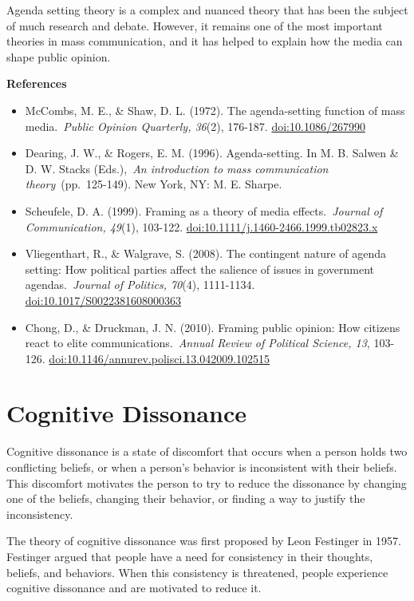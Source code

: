 \documentclass[
  b5paper]{book}
\begin{document}
Agenda setting theory is a complex and nuanced theory that has been the subject of much research and debate. However, it remains one of the most important theories in mass communication, and it has helped to explain how the media can shape public opinion.

\textbf{References}

\begin{itemize}
\item
  McCombs, M. E., \& Shaw, D. L. (1972). The agenda-setting function of mass media.~\emph{Public Opinion Quarterly, 36}(2), 176-187. \url{doi:10.1086/267990}
\item
  Dearing, J. W., \& Rogers, E. M. (1996). Agenda-setting. In M. B. Salwen \& D. W. Stacks (Eds.),~\emph{An introduction to mass communication theory}~(pp.~125-149). New York, NY: M. E. Sharpe.
\item
  Scheufele, D. A. (1999). Framing as a theory of media effects.~\emph{Journal of Communication, 49}(1), 103-122. \url{doi:10.1111/j.1460-2466.1999.tb02823.x}
\item
  Vliegenthart, R., \& Walgrave, S. (2008). The contingent nature of agenda setting: How political parties affect the salience of issues in government agendas.~\emph{Journal of Politics, 70}(4), 1111-1134. \url{doi:10.1017/S0022381608000363}
\item
  Chong, D., \& Druckman, J. N. (2010). Framing public opinion: How citizens react to elite communications.~\emph{Annual Review of Political Science, 13}, 103-126. \url{doi:10.1146/annurev.polisci.13.042009.102515}
\end{itemize}

\hypertarget{cognitive-dissonance}{%
\section{Cognitive Dissonance}\label{cognitive-dissonance}}

Cognitive dissonance is a state of discomfort that occurs when a person holds two conflicting beliefs, or when a person's behavior is inconsistent with their beliefs. This discomfort motivates the person to try to reduce the dissonance by changing one of the beliefs, changing their behavior, or finding a way to justify the inconsistency.

The theory of cognitive dissonance was first proposed by Leon Festinger in 1957. Festinger argued that people have a need for consistency in their thoughts, beliefs, and behaviors. When this consistency is threatened, people experience cognitive dissonance and are motivated to reduce it.
\end{document}
